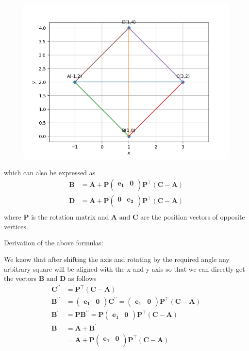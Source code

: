 \documentclass[12pt]{article}
\providecommand{\brak}[1]{\ensuremath{\left(#1\right)}}
\newcommand{\myvec}[1]{\ensuremath{\begin{pmatrix}#1\end{pmatrix}}}
\let\vec\mathbf
\begin{document}
\begin{figure}[!h]
	\begin{center} 
	    \includegraphics[width=\columnwidth]{chapters/10/7/4/4/figs/square4}
	\end{center}
\caption{}
\label{fig:7/4/4/4Fig5}
\end{figure}
which can also be expressed as
\begin{align}
\vec{B} &= \vec{A} + \vec{P}\myvec{
\vec{e_{1}}&\vec{0}\\
}
\vec{P}^\top \brak{\vec{C}-\vec{A}}\\
\vec{D} &= \vec{A} + \vec{P}\myvec{
\vec{0}&\vec{e_{2}}\\
}
\vec{P}^\top \brak{\vec{C}-\vec{A}}\\
\end{align}
where $\vec{P}$ is the rotation matrix and $\vec{A} \text{ and } \vec{C}$ are the position vectors of opposite vertices.

Derivation of the above formulas:

We know that after shifting the axis and rotating by the required angle any arbitrary square will be aligned with the x and y axis so that we can directly get the vectors $\vec{B} \text{ and } \vec{D}$ as follows
\begin{align}
\vec{C^{\prime\prime}} &= \vec{P}^\top \brak{\vec{C} - \vec{A}}\\
\vec{B^{\prime\prime}} &= \myvec{
\vec{e_{1}} & \vec{0}
}\vec{C^{\prime\prime}} = \myvec{
\vec{e_{1}} & \vec{0}
}\vec{P}^\top \brak{\vec{C} - \vec{A}}\\
\vec{B^{\prime}} &= \vec{P} \vec{B^{\prime\prime}}  = \vec{P}\myvec{
\vec{e_{1}} & \vec{0}
}\vec{P}^\top \brak{\vec{C} - \vec{A}}\\
\vec{B} &= \vec{A}+\vec{B^{\prime}}\\
 &= \vec{A} + \vec{P}\myvec{
\vec{e_{1}}&\vec{0}\\
}
\vec{P}^\top\brak{\vec{C}-\vec{A}}
\end{align}
\end{document}
